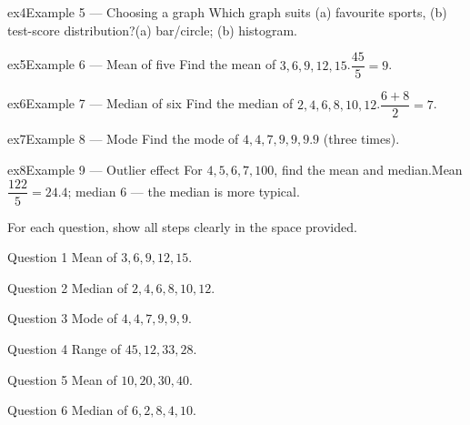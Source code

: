 \documentclass[11pt]{article}
\begin{document}
\begin{example}{ex4}{Example 5 --- Choosing a graph}
Which graph suits (a) favourite sports, (b) test-score distribution?\soln (a) bar/circle; (b) histogram.
\end{example}

\begin{example}{ex5}{Example 6 --- Mean of five}
Find the mean of $3, 6, 9, 12, 15$.\soln $\dfrac{45}{5}=9$.
\end{example}

\begin{example}{ex6}{Example 7 --- Median of six}
Find the median of $2, 4, 6, 8, 10, 12$.\soln $\dfrac{6+8}{2}=7$.
\end{example}

\begin{example}{ex7}{Example 8 --- Mode}
Find the mode of $4, 4, 7, 9, 9, 9$.\soln $9$ (three times).
\end{example}

\begin{example}{ex8}{Example 9 --- Outlier effect}
For $4, 5, 6, 7, 100$, find the mean and median.\soln Mean $\dfrac{122}{5}=24.4$; median $6$ — the median is more typical.
\end{example}

\clearpage
{}
For each question, show all steps clearly in the space provided.

\begin{qbox}{Question 1}
Mean of $3, 6, 9, 12, 15$.\workspace{2.4cm}
\end{qbox}

\begin{qbox}{Question 2}
Median of $2, 4, 6, 8, 10, 12$.\workspace{2.4cm}
\end{qbox}

\begin{qbox}{Question 3}
Mode of $4, 4, 7, 9, 9, 9$.\workspace{2.4cm}
\end{qbox}

\begin{qbox}{Question 4}
Range of $45, 12, 33, 28$.\workspace{2.4cm}
\end{qbox}

\begin{qbox}{Question 5}
Mean of $10, 20, 30, 40$.\workspace{2.4cm}
\end{qbox}

\begin{qbox}{Question 6}
Median of $6, 2, 8, 4, 10$.\workspace{2.4cm}
\end{qbox}
\end{document}
